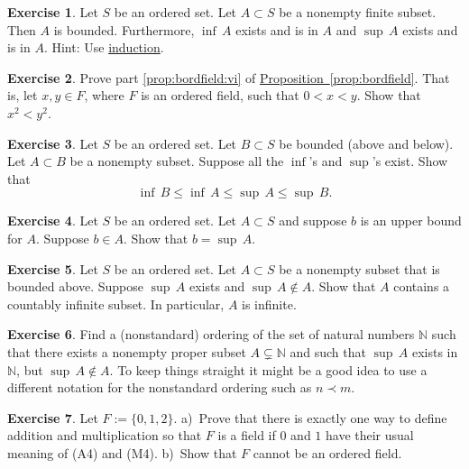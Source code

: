 \documentclass[12pt]{book}
\newcommand{\N}{{\mathbb{N}}}
\theoremstyle{plain}
\theoremstyle{remark}
\theoremstyle{definition}
\theoremstyle{exercise}
\newtheorem{exercise}{Exercise}[section]
\theoremstyle{example}
\newcommand{\propref}[1]{\hyperref[#1]{Proposition~\ref*{#1}}}
\begin{document}
\begin{exercise} \label{exercise:finitesethasminmax}
Let $S$ be an ordered set.  Let $A \subset S$ be a nonempty finite subset.
Then $A$ is bounded.  Furthermore,
$\inf\, A$ exists and is in $A$ and 
$\sup\, A$ exists and is in $A$.  Hint: Use
\hyperref[induction:thm]{induction}.
\end{exercise}

\begin{exercise} \label{exercise:squareineq}
Prove part \ref{prop:bordfield:vi} of \propref{prop:bordfield}.
That is, let $x, y \in F$, where $F$ is an ordered field, such that
$0 < x < y$.  Show that $x^2 < y^2$.
\end{exercise}

\begin{exercise}
Let $S$ be an ordered set.  Let $B \subset S$ be bounded (above and
below).  Let $A \subset B$ be a nonempty subset.
Suppose all the $\inf$'s and
$\sup$'s exist. Show that
\begin{equation*}
\inf\, B \leq \inf\, A \leq \sup\, A \leq \sup\, B .
\end{equation*}
\end{exercise}

\begin{exercise}
Let $S$ be an ordered set.  Let $A \subset S$ and suppose 
$b$ is an upper bound for $A$.  Suppose $b \in A$.  Show
that $b = \sup\, A$.
\end{exercise}

\begin{exercise}
Let $S$ be an ordered set.  Let $A \subset S$ be a nonempty subset
that is bounded above.
Suppose $\sup\, A$ exists and
$\sup\, A \notin A$.
Show that $A$ contains a countably infinite
subset.
In particular, $A$ is infinite.
\end{exercise}

\begin{exercise}
Find a (nonstandard) ordering of the set of natural numbers $\N$
such that there exists a nonempty proper subset $A \subsetneq \N$
and such that $\sup\, A$ exists in $\N$, but $\sup\, A \notin A$.
To keep things straight it might be a good idea to use a different
notation for the nonstandard ordering such as $n \prec m$.
\end{exercise}

\begin{exercise}
Let $F := \{ 0, 1, 2 \}$.  a)~Prove that there is
exactly one way to define addition and multiplication so that $F$ is
a field if $0$ and $1$ have their usual meaning of (A4) and (M4).
b)~Show that $F$ cannot be an ordered field.
\end{exercise}
\end{document}
